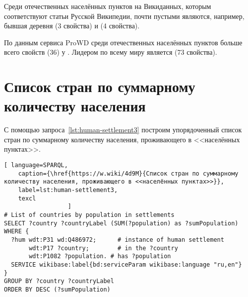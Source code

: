Среди отечественных населённых пунктов на Викиданных, 
которым соответствуют статьи Русской Википедии, 
почти пустыми являются, например, 
бывшая деревня  (3 свойства) 
и  (4 свойства).

По данным сервиса ProWD 
среди отечественных населённых пунктов 
больше всего свойств (36) у . 
Лидером по всему миру является  (73 свойства)\autocite{humansettlements_ProWD}.




\section{Список стран по суммарному количеству населения}

С помощью запроса~\ref{lst:human-settlement3} 
построим упорядоченный список стран по суммарному количеству населения, проживающего в <<населённых пунктах>>.

\lstset{numbers=left, firstnumber=1, frame=single}
\begin{lstlisting}[ language=SPARQL, 
    caption={\href{https://w.wiki/4d9M}{Список стран по суммарному количеству населения, проживающего в <<населённых пунктах>>}},
    label=lst:human-settlement3,
    texcl 
                  ]
# List of countries by population in settlements
SELECT ?country ?countryLabel (SUM(?population) as ?sumPopulation)
WHERE {
  ?hum wdt:P31 wd:Q486972;  	# instance of human settlement
       wdt:P17 ?country;    	# in the ?country
       wdt:P1082 ?population. # has ?population
  SERVICE wikibase:label{bd:serviceParam wikibase:language "ru,en"}
}
GROUP BY ?country ?countryLabel 
ORDER BY DESC (?sumPopulation)
\end{lstlisting}%

